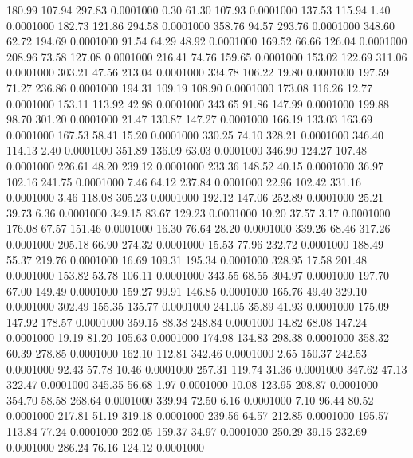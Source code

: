  180.99  107.94  297.83   0.0001000
   0.30   61.30  107.93   0.0001000
 137.53  115.94    1.40   0.0001000
 182.73  121.86  294.58   0.0001000
 358.76   94.57  293.76   0.0001000
 348.60   62.72  194.69   0.0001000
  91.54   64.29   48.92   0.0001000
 169.52   66.66  126.04   0.0001000
 208.96   73.58  127.08   0.0001000
 216.41   74.76  159.65   0.0001000
 153.02  122.69  311.06   0.0001000
 303.21   47.56  213.04   0.0001000
 334.78  106.22   19.80   0.0001000
 197.59   71.27  236.86   0.0001000
 194.31  109.19  108.90   0.0001000
 173.08  116.26   12.77   0.0001000
 153.11  113.92   42.98   0.0001000
 343.65   91.86  147.99   0.0001000
 199.88   98.70  301.20   0.0001000
  21.47  130.87  147.27   0.0001000
 166.19  133.03  163.69   0.0001000
 167.53   58.41   15.20   0.0001000
 330.25   74.10  328.21   0.0001000
 346.40  114.13    2.40   0.0001000
 351.89  136.09   63.03   0.0001000
 346.90  124.27  107.48   0.0001000
 226.61   48.20  239.12   0.0001000
 233.36  148.52   40.15   0.0001000
  36.97  102.16  241.75   0.0001000
   7.46   64.12  237.84   0.0001000
  22.96  102.42  331.16   0.0001000
   3.46  118.08  305.23   0.0001000
 192.12  147.06  252.89   0.0001000
  25.21   39.73    6.36   0.0001000
 349.15   83.67  129.23   0.0001000
  10.20   37.57    3.17   0.0001000
 176.08   67.57  151.46   0.0001000
  16.30   76.64   28.20   0.0001000
 339.26   68.46  317.26   0.0001000
 205.18   66.90  274.32   0.0001000
  15.53   77.96  232.72   0.0001000
 188.49   55.37  219.76   0.0001000
  16.69  109.31  195.34   0.0001000
 328.95   17.58  201.48   0.0001000
 153.82   53.78  106.11   0.0001000
 343.55   68.55  304.97   0.0001000
 197.70   67.00  149.49   0.0001000
 159.27   99.91  146.85   0.0001000
 165.76   49.40  329.10   0.0001000
 302.49  155.35  135.77   0.0001000
 241.05   35.89   41.93   0.0001000
 175.09  147.92  178.57   0.0001000
 359.15   88.38  248.84   0.0001000
  14.82   68.08  147.24   0.0001000
  19.19   81.20  105.63   0.0001000
 174.98  134.83  298.38   0.0001000
 358.32   60.39  278.85   0.0001000
 162.10  112.81  342.46   0.0001000
   2.65  150.37  242.53   0.0001000
  92.43   57.78   10.46   0.0001000
 257.31  119.74   31.36   0.0001000
 347.62   47.13  322.47   0.0001000
 345.35   56.68    1.97   0.0001000
  10.08  123.95  208.87   0.0001000
 354.70   58.58  268.64   0.0001000
 339.94   72.50    6.16   0.0001000
   7.10   96.44   80.52   0.0001000
 217.81   51.19  319.18   0.0001000
 239.56   64.57  212.85   0.0001000
 195.57  113.84   77.24   0.0001000
 292.05  159.37   34.97   0.0001000
 250.29   39.15  232.69   0.0001000
 286.24   76.16  124.12   0.0001000
